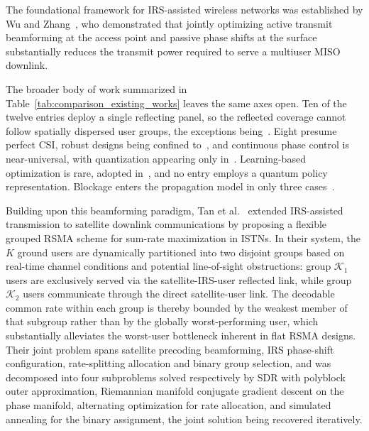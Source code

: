 \documentclass[12pt,onecolumn]{IEEEtran}
\newif\iffull
\begin{document}
The foundational framework for IRS-assisted wireless networks was established by Wu and Zhang~\cite{wu2019intelligent}, who demonstrated that jointly optimizing active transmit beamforming at the access point and passive phase shifts at the surface substantially reduces the transmit power required to serve a multiuser MISO downlink.

The broader body of work summarized in Table~\ref{tab:comparison_existing_works} leaves the same axes open.
Ten of the twelve entries deploy a single reflecting panel, so the reflected coverage cannot follow spatially dispersed user groups, the exceptions being~\cite{li2025sum,he2026weighted}.
Eight presume perfect CSI, robust designs being confined to~\cite{cao2022robust,peng2025robust,he2026weighted,zhang2026satellite}, and continuous phase control is near-universal, with quantization appearing only in~\cite{peng2025robust,han2025weighted}.
Learning-based optimization is rare, adopted in~\cite{meng2023sum,fu2025average}, and no entry employs a quantum policy representation.
Blockage enters the propagation model in only three cases~\cite{cao2022robust,dong2022intelligent,li2025sum}.

\iffull
Building upon this beamforming paradigm, Tan et al.~\cite{tan2025flexible} extended IRS-assisted transmission to satellite downlink communications by proposing a flexible grouped RSMA scheme for sum-rate maximization in ISTNs.
In their system, the $K$ ground users are dynamically partitioned into two disjoint groups based on real-time channel conditions and potential line-of-sight obstructions: group $\mathcal{K}_1$ users are exclusively served via the satellite-IRS-user reflected link, while group $\mathcal{K}_2$ users communicate through the direct satellite-user link.
The decodable common rate within each group is thereby bounded by the weakest member of that subgroup rather than by the globally worst-performing user, which substantially alleviates the worst-user bottleneck inherent in flat RSMA designs.
Their joint problem spans satellite precoding beamforming, IRS phase-shift configuration, rate-splitting allocation and binary group selection, and was decomposed into four subproblems solved respectively by SDR with polyblock outer approximation, Riemannian manifold conjugate gradient descent on the phase manifold, alternating optimization for rate allocation, and simulated annealing for the binary assignment, the joint solution being recovered iteratively.
\end{document}
